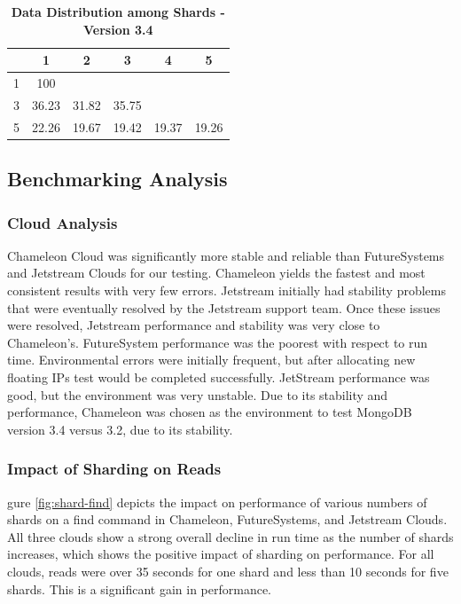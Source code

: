 \documentclass[9pt,twocolumn,twoside]{../../styles/osajnl}
\begin{document}
\begin{table}[htbp]
\centering
\caption{\bf Data Distribution among Shards - Version 3.4}

 \begin{tabular}{| c | c | c | c | c | c |} 
 \hline
  &  1    &  2    &  3    &   4   & 5 \\ [0.5ex]
\hline
  \hline
1 & 100   &       &       &       &   \\
\hline
3 & 36.23 & 31.82 & 35.75 &       &   \\
\hline
5 & 22.26 & 19.67 & 19.42 & 19.37 & 19.26   \\
\hline
\end{tabular}
  \label{tab:data-dist34}
\end{table}






\subsection{Benchmarking Analysis}


\subsubsection{Cloud Analysis}

Chameleon Cloud was significantly more stable and reliable than FutureSystems and Jetstream Clouds for our testing.  Chameleon yields the fastest and most consistent results with very few errors.  Jetstream initially had stability problems that were eventually resolved by the Jetstream support team.  Once these issues were resolved, Jetstream performance and stability was very close to Chameleon's.  FutureSystem performance was the poorest with respect to run time.  Environmental errors were initially frequent, but after allocating new floating IPs test would be completed successfully.  JetStream performance was good, but the environment was very unstable.  Due to its stability and performance, Chameleon was chosen as the environment to test MongoDB version 3.4 versus 3.2, due to its stability.

\subsubsection{Impact of Sharding on Reads}


gure \ref{fig:shard-find} depicts the impact on performance of various numbers of shards on a find command in Chameleon, FutureSystems, and Jetstream Clouds.  All three clouds show a strong overall decline in run time as the number of shards increases, which shows the positive impact of sharding on performance.  For all clouds, reads were over 35 seconds for one shard and less than 10 seconds for five shards.  This is a significant gain in performance. 
\end{document}
